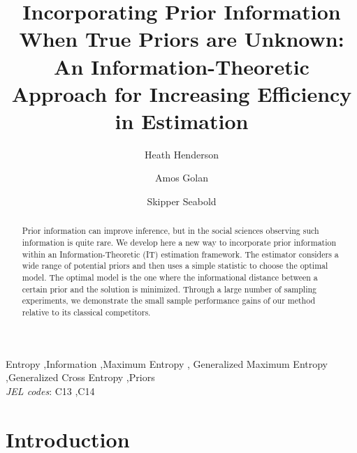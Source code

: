\documentclass{elsarticle}
\begin{document}
\begin{frontmatter}

\title{Incorporating Prior Information When True Priors are Unknown: An 
Information-Theoretic Approach for Increasing Efficiency in Estimation}

\author[hh]{Heath Henderson}
\author[ag]{Amos Golan}
\author[ss]{Skipper Seabold}

\address[hh]{Department of Economics, Iowa State University}
\address[ag]{Info-Metrics Institute and Department of Economics, 
American University}
\address[ss]{Department of Economics, American University}

\begin{abstract}
Prior information can improve inference, but in the social sciences observing such
information is quite rare.
We develop here a new way to incorporate prior information within an 
Information-Theoretic (IT) estimation framework. 
The estimator considers a wide range of potential priors and then uses a simple statistic 
to choose the optimal model. 
The optimal model is the one where the informational distance between a certain prior and 
the solution is minimized.
Through a large number of sampling experiments, we demonstrate the small sample 
performance gains of our method relative to its classical competitors.
\end{abstract}

\begin{keyword}
Entropy \sep Information \sep Maximum Entropy \sep 
Generalized Maximum Entropy \sep Generalized Cross Entropy \sep Priors \\
\textit{JEL codes}: C13 \sep C14  
\end{keyword}

\end{frontmatter}

\doublespacing


\section{Introduction}
\label{sec: intro}
\end{document}
